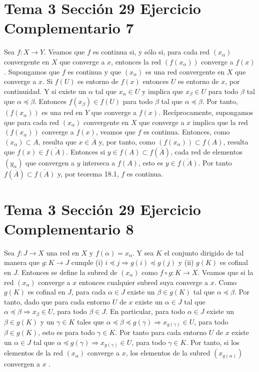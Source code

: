 \documentclass{article}
\begin{document}
\section{Tema 3 Sección 29 Ejercicio Complementario 7}
Sea $f:X\rightarrow Y$. Veamos que $f$ es continua si, y sólo si, para cada red  $(x_\alpha)$ convergente en $X$ que converge a $x$, entonces la red $(f(x_\alpha))$ converge a $f(x)$. Supongamos que $f$ es continua y que $(x_\alpha)$ es una red convergente en $X$ que converge a $x$. Si $f(U)$ es entorno de $f(x)$ entonces $U$ es entorno de $x$, por continuidad. Y si existe un $\alpha$ tal que $x_\alpha \in U$ y implica que $x_\beta \in U$ para todo $\beta$ tal que $\alpha\preceq \beta$. Entonces $f(x_\beta)\in f(U)$ para todo $\beta$ tal que $\alpha\preceq \beta$. Por tanto, $(f(x_\alpha))$ es una red en $Y$ que converge a $f(x)$. Recíprocamente, supongamos que para cada red $(x_\alpha)$ convergente en $X$ que converge a $x$ implica que la red $(f(x_\alpha))$ converge a $f(x)$, veamos que $f$ es continua. Entonces, como $(x_\alpha)\subset A$, resulta que $x\in \overline{A}$ y, por tanto, como $(f(x_\alpha))\subset f(A)$, resulta que $f(x)\in \overline{f(A)}$. Entonces si $y\in f(A)\subset f(\overline{A})$, cada red de elementos $(y_\alpha)$ que convergen a $y$ interseca a $f(A)$, esto es $y\in \overline{f(A)}$. Por tanto $f(\overline{A})\subset\overline{f(A)}$ y, por teorema 18.1, $f$ es continua.
\section{Tema 3 Sección 29 Ejercicio Complementario 8}
Sea $f:J\rightarrow X$ una red en $X$  y $f(\alpha)=x_\alpha$. Y sea $K$ el conjunto dirigido de tal manera que $g:K\rightarrow J$ cumple (i) $i\preceq j\Rightarrow g(i)\preceq g(j)$ y (ii) $g(K)$ es cofinal en $J$. Entonces se define la subred de $(x_\alpha)$ como $f\circ g:K\rightarrow X$. Veamos que si la red $(x_\alpha)$ converge a $x$ entonces cualquier subred suya converge a $x$. Como $g(K)$ es cofinal en $J$, para cada $\alpha\in J$ existe un $\beta \in g(K)$ tal que $\alpha\preceq \beta$. Por tanto, dado que para cada entorno $U$ de $x$ existe un $\alpha \in J$ tal que $\alpha \preceq \beta \Rightarrow x_\beta\in U$, para todo $\beta \in J$. En particular, para todo $\alpha \in J$ existe un $\beta\in g(K)$ y un $\gamma\in K$ tales que  $\alpha\preceq \beta \preceq g(\gamma) \Rightarrow x_{g(\gamma)}\in U$, para todo $\beta \in g(K)$, esto es para todo $\gamma\in K$. Por tanto para cada entorno $U$ de $x$ existe un $\alpha\in J$ tal que $\alpha \preceq g(\gamma) \Rightarrow x_{g(\gamma)}\in U$, para todo $\gamma\in K$. Por tanto, si los elementos de la red $(x_{\alpha})$ converge a $x$, los elementos de la subred $(x_{g(\alpha)})$ convergen a $x$ .
\end{document}
